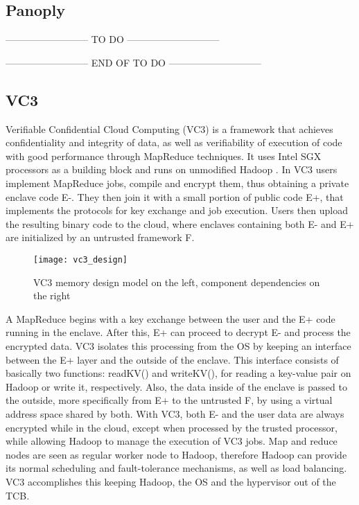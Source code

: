 \subsection{Panoply}
-------------------------- TO DO -----------------------------



-------------------------- END OF TO DO -----------------------------

\subsection{VC3}
\label{ssec:vc3_mapreduce}

Verifiable Confidential Cloud Computing (VC3) \cite{vc3Paper} is a framework that achieves confidentiality and integrity of data, as well as verifiability of execution of code with good performance through MapReduce \cite{mapReduce} techniques. It uses Intel SGX processors as a building block and runs on unmodified Hadoop \cite{hadoop}.
In VC3 users implement MapReduce jobs, compile and encrypt them, thus obtaining a private enclave code E-. They then join it with a small portion of public code E+, that implements the protocols for key exchange and job execution.
Users then upload the resulting binary code to the cloud, where enclaves containing both E- and E+ are initialized by an untrusted framework F. 

\begin{figure}[htbp]
	\centering
	{\texttt{[image: vc3\_design]}}%
	\caption{VC3 memory design model on the left, component dependencies on the right}
\end{figure}

A MapReduce begins with a key exchange between the user and the E+ code running in the enclave. After this, E+ can proceed to decrypt E- and process the encrypted data. VC3 isolates this processing from the OS by keeping an interface between the E+ layer and the outside of the enclave. This interface consists of basically two functions: readKV() and writeKV(), for reading a key-value pair on Hadoop or write it, respectively. Also, the data inside of the enclave is passed to the outside, more specifically from E+ to the untrusted F, by using a virtual address space shared by both.
With VC3, both E- and the user data are always encrypted while in the cloud, except when processed by the trusted processor, while allowing Hadoop to manage the execution of VC3 jobs. Map and reduce nodes are seen as regular worker node to Hadoop, therefore Hadoop can provide its normal scheduling and fault-tolerance mechanisms, as well as load balancing. VC3 accomplishes this keeping Hadoop, the OS and the hypervisor out of the TCB.


